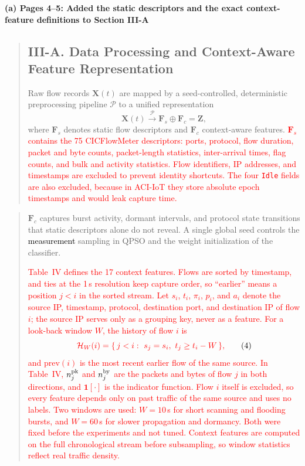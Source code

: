 \documentclass[11pt]{article}
\newenvironment{excerpt}{\begin{quote}\sloppy}{\end{quote}}
\newcommand{\mshead}[2]{\subsection*{\textbf{#1. #2}}}
\newcommand{\loc}[1]{\par\medskip\noindent\textbf{#1}\par}
\begin{document}
\loc{(a) Pages 4--5: Added the static descriptors and the exact context-feature definitions to Section III-A}
\begin{excerpt}
\mshead{III-A}{Data Processing and Context-Aware Feature Representation}


Raw flow records $\mathbf{X}(t)$ are mapped by a seed-controlled,
deterministic preprocessing pipeline $\mathcal{P}$ to a unified
representation
\begin{equation}
\mathbf{X}(t) \xrightarrow{\mathcal{P}}
\mathbf{F}_s \oplus \mathbf{F}_c = \mathbf{Z},
\tag{3}
\end{equation}
where $\mathbf{F}_s$ denotes static flow descriptors and
$\mathbf{F}_c$ context-aware features.
\textcolor{red}{$\mathbf{F}_s$ contains the 75 CICFlowMeter
descriptors: ports, protocol, flow duration, packet and byte counts,
packet-length statistics, inter-arrival times, flag counts, and bulk
and activity statistics. Flow identifiers, IP addresses, and
timestamps are excluded to prevent identity shortcuts. The four
\texttt{Idle} fields are also excluded, because in ACI-IoT they store
absolute epoch timestamps and would leak capture time.}
\end{excerpt}
\begin{excerpt}
$\mathbf{F}_c$ captures burst activity, dormant intervals, and
protocol state transitions that static descriptors alone do not
reveal. A single global seed controls the
\textcolor{black}{measurement} sampling in QPSO and the
weight initialization of the classifier.

\textcolor{red}{Table~IV defines
the 17 context features. Flows are sorted by timestamp, and ties at
the 1\,s resolution keep capture order, so ``earlier'' means a
position $j<i$ in the sorted stream. Let $s_i$, $t_i$, $\pi_i$,
$p_i$, and $a_i$ denote the source IP, timestamp, protocol,
destination port, and destination IP of flow $i$; the source IP
serves only as a grouping key, never as a feature. For a look-back
window $W$, the history of flow $i$ is}
\begin{equation}
\textcolor{red}{\mathcal{H}_W(i)=\{\,j<i:\ s_j=s_i,\ t_j\ge t_i-W\,\},}
\tag{4}
\end{equation}
\textcolor{red}{and $\mathrm{prev}(i)$ is the most recent
earlier flow of the same source. In Table~IV,
$n^{\rm pk}_j$ and $n^{\rm by}_j$ are the packets and bytes of flow
$j$ in both directions, and $\mathbf{1}[\cdot]$ is the indicator
function. Flow $i$ itself is excluded, so
every feature depends only on past traffic of the same source and
uses no labels. Two windows are used: $W=10$\,s for short scanning
and flooding bursts, and $W=60$\,s for slower propagation and
dormancy. Both were fixed before the experiments and not tuned.
Context features are computed on the full chronological stream
before subsampling, so window statistics reflect real traffic
density.}
\end{excerpt}
\end{document}
